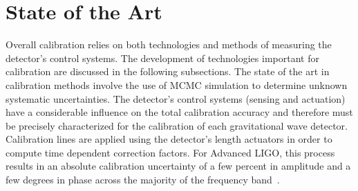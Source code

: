 
\section{State of the Art}
Overall calibration relies on both technologies and methods of measuring the detector’s control systems. The development of technologies important for calibration are discussed in the following subsections. The state of the art in calibration methods involve the use of \ac{MCMC} simulation to determine unknown systematic uncertainties.
\pagebreak
The detector's control systems (sensing and actuation) have a considerable influence on the total calibration accuracy and therefore must be precisely characterized for the calibration of each gravitational wave detector.
Calibration lines are applied using the detector's length actuators in order to compute time dependent correction factors.
For Advanced LIGO, this process results in an absolute calibration uncertainty of a few percent in amplitude and a few degrees in phase across the majority of the frequency band~\cite{PhysRevD.96.102001}.

